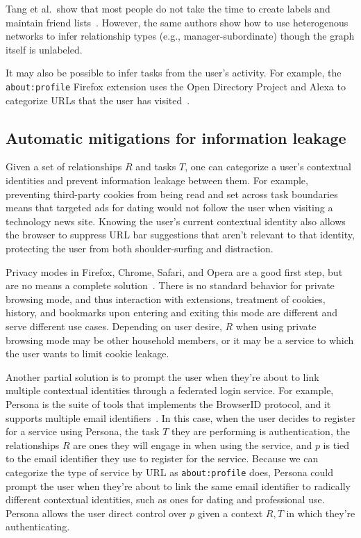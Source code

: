\documentclass{llncs}
\begin{document}
Tang et al.~show that most people do not take the time to create labels and
maintain friend lists~\cite{tang}. However, the same authors show how to use
heterogenous networks to infer relationship types (e.g., manager-subordinate)
though the graph itself is unlabeled.

It may also be possible to infer tasks from the user's activity. For example,
the \texttt{about:profile} Firefox extension uses the Open Directory Project
and Alexa to categorize URLs that the user has visited~\cite{aboutprofile}.

\subsection{Automatic mitigations for information leakage}
Given a set of relationships $R$ and tasks $T$, one can categorize a user's
contextual identities and prevent information leakage between them.  For
example, preventing third-party cookies from being read and set across task
boundaries means that targeted ads for dating would not follow the user when
visiting a technology news site. Knowing the user's current contextual identity
also allows the browser to suppress URL bar suggestions that aren't relevant to
that identity, protecting the user from both shoulder-surfing and distraction.

Privacy modes in Firefox, Chrome, Safari, and Opera are a good first step, but
are no means a complete solution~\cite{ABBJ10}. There is no standard behavior
for private browsing mode, and thus interaction with extensions, treatment of
cookies, history, and bookmarks upon entering and exiting this mode are
different and serve different use cases. Depending on user desire, $R$ when
using private browsing mode may be other household members, or it may be a
service to which the user wants to limit cookie leakage.

Another partial solution is to prompt the user when they're about to link
multiple contextual identities through a federated login service. For example,
Persona is the suite of tools that implements the BrowserID protocol, and it
supports multiple email identifiers~\cite{browserid}. In this case, when the
user decides to register for a service using Persona, the task $T$ they are
performing is authentication, the relationships $R$ are ones they will engage
in when using the service, and $p$ is tied to the email identifier they use to
register for the service. Because we can categorize the type of service by URL
as \texttt{about:profile} does, Persona could prompt the user when they're about
to link the same email identifier to radically different contextual identities,
such as ones for dating and professional use.  Persona allows the user direct
control over $p$ given a context {$R,T$} in which they're authenticating.
\end{document}

